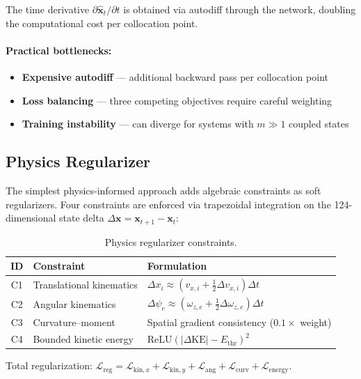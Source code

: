 \documentclass[11pt]{article}
\newcommand{\xhat}{\hat{\mathbf{x}}}
\begin{document}
The time derivative $\partial \xhat_t / \partial t$ is obtained via autodiff through the network, doubling the computational cost per collocation point.

\paragraph{Practical bottlenecks:}
\begin{itemize}
  \item \textbf{Expensive autodiff} --- additional backward pass per collocation point
  \item \textbf{Loss balancing} --- three competing objectives require careful weighting
  \item \textbf{Training instability} --- can diverge for systems with $m \gg 1$ coupled states
\end{itemize}

\subsection{Physics Regularizer}
\label{sec:pinn:regularizer}

The simplest physics-informed approach adds algebraic constraints as soft regularizers.
Four constraints are enforced via trapezoidal integration on the 124-dimensional state delta $\Delta\mathbf{x} = \mathbf{x}_{t+1} - \mathbf{x}_t$:

\begin{table}[H]
  \centering
  \small
  \renewcommand{\arraystretch}{1.3}
  \caption{Physics regularizer constraints.}
  \label{tab:pinn-constraints}
  \begin{tabular}{@{}clp{7.5cm}@{}}
    \toprule
    \textbf{ID} & \textbf{Constraint} & \textbf{Formulation} \\
    \midrule
    C1 & Translational kinematics & $\Delta x_i \approx (v_{x,i} + \tfrac{1}{2}\Delta v_{x,i})\Delta t$ \\
    C2 & Angular kinematics & $\Delta\psi_e \approx (\omega_{z,e} + \tfrac{1}{2}\Delta\omega_{z,e})\Delta t$ \\
    C3 & Curvature--moment & Spatial gradient consistency ($0.1\times$ weight) \\
    C4 & Bounded kinetic energy & $\text{ReLU}(|\Delta\text{KE}| - E_{\text{thr}})^2$ \\
    \bottomrule
  \end{tabular}
\end{table}

Total regularization: $\mathcal{L}_{\mathrm{reg}} = \mathcal{L}_{\mathrm{kin},x} + \mathcal{L}_{\mathrm{kin},y} + \mathcal{L}_{\mathrm{ang}} + \mathcal{L}_{\mathrm{curv}} + \mathcal{L}_{\mathrm{energy}}$.
\end{document}
